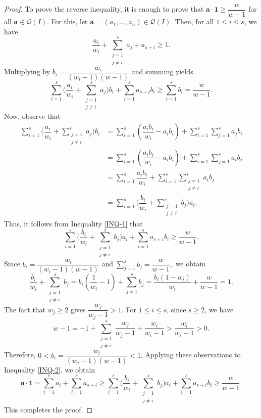 \documentclass[12pt,reqno]{amsart}
\theoremstyle{definition}
\newcommand{\ba}{\mathbf{a}}
\newcommand{\symbpoly}{\mathcal{Q}}
\numberwithin{equation}{section}
\begin{document}
\begin{proof}
    To prove the reverse inequality, it is enough to prove that $\ba \cdot \mathbf{1} \ge \dfrac{w}{w - 1}$ for all $\ba \in \symbpoly(I).$ For this, let $\ba = (a_1, \ldots, a_n) \in \symbpoly(I).$ Then, for all $1 \le i \le s$, we have
    \[\dfrac{a_i}{w_i} + \sum_{\substack{j = 1 \\ j \ne i}}^{s} a_j + a_{s + i} \ge 1.\]
    Multiplying by $b_i = \dfrac{w_i}{(w_i - 1)(w - 1)}$ and summing yields
    \begin{equation}\label{INQ-1}
        \sum_{i = 1}^{s} \Bigg( \dfrac{a_i}{w_i} + \sum_{\substack{j = 1 \\ j \ne i}}^{s} a_j \Bigg) b_i + \sum_{i = 1}^{s} a_{s + i} b_i \ge \sum_{i = 1}^{s} b_i = \dfrac{w}{w - 1}.
    \end{equation}
    Now, observe that
    \begin{align*}
        \sum_{i = 1}^{s} \Bigg( \dfrac{a_i}{w_i} + \sum_{\substack{j = 1 \\ j \ne i}}^{s} a_j \Bigg) b_i & = \sum_{i = 1}^{s} \left( \dfrac{a_i b_i}{w_i} - a_i b_i \right) + \sum_{i = 1}^{s} \sum_{j = 1}^{s} a_j b_i \\ 
        & = \sum_{i = 1}^{s} \left( \dfrac{a_i b_i}{w_i} - a_i b_i \right) + \sum_{i = 1}^{s} \sum_{j = 1}^{s} a_i b_j \\ 
        & = \sum_{i = 1}^{s} \dfrac{a_i b_i}{w_i} + \sum_{i = 1}^{s} \sum_{\substack{j = 1 \\ j \ne i}}^{s} a_i b_j \\ 
        & = \sum_{i = 1}^{s} \Bigg( \dfrac{b_i}{w_i} + \sum_{\substack{j = 1 \\ j \ne i}}^{s} b_j \Bigg) a_i. 
    \end{align*}
    Thus, it follows from Inequality \ref{INQ-1} that
    \begin{equation}\label{INQ-2}
        \sum_{i = 1}^{s} \Bigg( \dfrac{b_i}{w_i} + \sum_{\substack{j = 1 \\ j \ne i}}^{s} b_j \Bigg) a_i + \sum_{i = 1}^{s} a_{s + i} b_i \ge \dfrac{w}{w - 1}.
    \end{equation}
   Since $b_i=\dfrac{w_i}{(w_i - 1)(w - 1)}$ and $\sum_{j = 1}^{s} b_j=\dfrac{w}{w - 1},$ we obtain
    \[\dfrac{b_i}{w_i} + \sum_{\substack{j = 1 \\ j \ne i}}^{s} b_j = b_i \left( \dfrac{1}{w_i} - 1 \right) +  \sum_{j = 1}^{s} b_j = \dfrac{b_i (1 - w_i)}{w_i} + \dfrac{w}{w - 1} = 1.\]
    The fact that $w_j \ge 2$ gives $\dfrac{w_j}{w_j - 1} > 1.$ For $1 \le i \le s$, since $s \ge 2$, we have 
    \[w - 1 = - 1 + \sum_{\substack{j = 1 \\ j \ne i}}^{s} \dfrac{w_j}{w_j - 1} + \dfrac{w_i}{w_i - 1} > \dfrac{w_i}{w_i - 1} > 0.\] Therefore, $0<b_i=\dfrac{w_i}{(w_i - 1)(w - 1)}<1.$ Applying these observations to Inequality \ref{INQ-2}, we obtain 
    \[\ba \cdot \mathbf{1} = \sum_{i = 1}^{s} a_i + \sum_{i = 1}^{s} a_{s + i} \ge \sum_{i = 1}^{s} \Bigg( \dfrac{b_i}{w_i} + \sum_{\substack{j = 1 \\ j \ne i}}^{s} b_j \Bigg) a_i + \sum_{i = 1}^{s} a_{s + i} b_i \ge \dfrac{w}{w - 1}.\]
    This completes the proof.
\end{proof}
\end{document}
